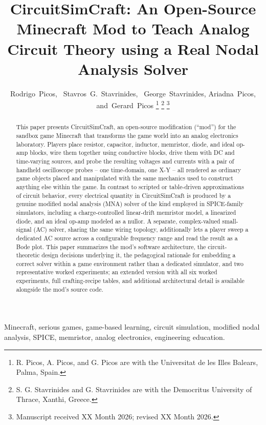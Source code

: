 \documentclass[journal]{IEEEtran}
\title{CircuitSimCraft: An Open-Source Minecraft Mod to Teach Analog Circuit Theory using a Real Nodal Analysis Solver}
\author{Rodrigo~Picos,~\IEEEmembership{Senior~Member,~IEEE,}
        Stavros~G.~Stavrinides,~\IEEEmembership{Senior~Member,~IEEE,}
        George~Stavrinides, Ariadna~Picos, and~Gerard~Picos%
\thanks{R. Picos, A. Picos, and G. Picos are with the Universitat de les Illes Balears, Palma, Spain.}%
\thanks{S. G. Stavrinides and G. Stavrinides are with the Democritus University of Thrace, Xanthi, Greece.}%
\thanks{Manuscript received XX Month 2026; revised XX Month 2026.}}
\begin{document}
\maketitle

\begin{abstract}
This paper presents CircuitSimCraft, an open-source modification (``mod'') for the sandbox
game Minecraft that transforms the game world into an analog electronics laboratory. Players
place resistor, capacitor, inductor, memristor, diode, and ideal op-amp blocks, wire them
together using conductive blocks, drive them with DC and time-varying sources, and probe the
resulting voltages and currents with a pair of handheld oscilloscope probes -- one
time-domain, one X-Y -- all rendered as ordinary game objects placed and manipulated with the
same mechanics used to construct anything else within the game. In contrast to scripted or
table-driven approximations of circuit behavior, every electrical quantity in CircuitSimCraft
is produced by a genuine modified nodal analysis (MNA) solver of the kind
employed in SPICE-family simulators, including a charge-controlled linear-drift memristor
model, a linearized diode, and an ideal op-amp modeled as a nullor. A separate, complex-valued
small-signal (AC) solver, sharing the same wiring topology, additionally lets a player sweep a
dedicated AC source across a configurable frequency range and read the result as a Bode plot.
This paper summarizes the mod's software architecture, the circuit-theoretic design decisions
underlying it, the pedagogical rationale for embedding a correct solver within a game
environment rather than a dedicated simulator, and two representative worked experiments; an
extended version with all six worked experiments, full crafting-recipe tables, and additional
architectural detail is available alongside the mod's source code.
\end{abstract}

\begin{IEEEkeywords}
Minecraft, serious games, game-based learning, circuit simulation, modified nodal analysis,
SPICE, memristor, analog electronics, engineering education.
\end{IEEEkeywords}

\IEEEpeerreviewmaketitle
















\end{document}
